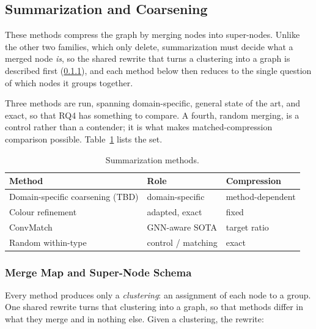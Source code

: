 \subsection{Summarization and Coarsening}
\label{sec:method:reduction:summarization}
These methods compress the graph by merging nodes into super-nodes. Unlike the other two
families, which only delete, summarization must decide what a merged node \emph{is}, so
the shared rewrite that turns a clustering into a graph is described first
(\ref{sec:method:summary:mergemap}), and each method below then reduces to the single
question of which nodes it groups together.

Three methods are run, spanning domain-specific, general state of the art, and exact, so
that RQ4 has something to compare. A fourth, random merging, is a control rather than a
contender; it is what makes matched-compression comparison possible.
Table~\ref{tab:summarization_methods} lists the set.

\begin{table}[htbp]
\centering
\caption{Summarization methods.}
\label{tab:summarization_methods}
\small
\begin{tabular}{lll}
\toprule
\textbf{Method} & \textbf{Role} & \textbf{Compression} \\
\midrule
Domain-specific coarsening (TBD) & domain-specific        & method-dependent \\
Colour refinement                & adapted, exact         & fixed \\
ConvMatch                        & GNN-aware SOTA         & target ratio \\
Random within-type               & control / matching     & exact \\
\bottomrule
\end{tabular}
\end{table}

\subsubsection{Merge Map and Super-Node Schema}
\label{sec:method:summary:mergemap}
Every method produces only a \emph{clustering}: an assignment of each node to a group. One
shared rewrite turns that clustering into a graph, so that methods differ in what they merge
and in nothing else. Given a clustering, the rewrite:

